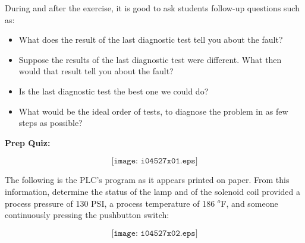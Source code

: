 During and after the exercise, it is good to ask students follow-up questions such as:

\begin{itemize}
\item{} What does the result of the last diagnostic test tell you about the fault?
\item{} Suppose the results of the last diagnostic test were different.  What then would that result tell you about the fault?
\item{} Is the last diagnostic test the best one we could do?
\item{} What would be the ideal order of tests, to diagnose the problem in as few steps as possible?
\end{itemize}


\vfil \eject

\noindent
{\bf Prep Quiz:}

$$\texttt{[image: i04527x01.eps]}$$

The following is the PLC's program as it appears printed on paper.  From this information, determine the status of the lamp and of the solenoid coil provided a process pressure of 130 PSI, a process temperature of 186 $^{o}$F, and someone continuously pressing the pushbutton switch:

$$\texttt{[image: i04527x02.eps]}$$





